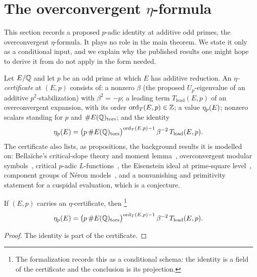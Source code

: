 \section{The overconvergent \texorpdfstring{$\eta$}{eta}-formula}
\label{sec:eta-formula}

This section records a proposed $p$-adic identity at additive odd primes,
the overconvergent $\eta$-formula.  It plays no role in the main theorem.
We state it only as a conditional input, and we explain why the published
results one might hope to derive it from do not apply in the form needed.

\begin{definition}\label{def:closure:eta-published-imports}
Let $E/\mathbb{Q}$ and let $p$ be an odd prime at which $E$ has additive reduction.
An \emph{$\eta$-certificate} at $(E,p)$ consists of: a nonzero $\beta$
(the proposed $U_p$-eigenvalue of an additive $p^2$-stabilization) with
$\beta^2=-p$; a leading term $T_{\mathrm{lead}}(E,p)$ of an overconvergent
expansion, with its order $\mathrm{ord}_T(E,p)\in\mathbb{Z}$; a value
$\eta_p(E)$; nonzero scalars standing for $p$ and $\#E(\mathbb{Q})_{\operatorname{tors}}$; and
the identity
\[
  \eta_p(E)
  =
  \bigl(p\,\#E(\mathbb{Q})_{\operatorname{tors}}\bigr)^{\mathrm{ord}_T(E,p)-1}
  \,\beta^{-2}\,
  T_{\mathrm{lead}}(E,p).
\]
The certificate also lists, as propositions, the background results it
is modelled on: Bella\"iche's critical-slope theory and moment
lemma~\citep{Bellaiche2012}, overconvergent modular
symbols~\citep{PollackStevens2011,ColemanMazur1998}, critical $p$-adic
$L$-functions~\citep{BenoisBuyukboduk2024}, the Eisenstein ideal at
prime-square level~\citep{LangWake2025}, component groups of N\'eron
models~\citep{Lorenzini1993,Ling1997}, and a nonvanishing and primitivity
statement for a cuspidal evaluation, which is a conjecture.
\end{definition}

\begin{theorem}\label{thm:closure:oc-eta-formula}
If $(E,p)$ carries an $\eta$-certificate, then%
\footnote{The formalization records this as a conditional schema: the
identity is a field of the certificate and the conclusion is its
projection.}
\[
  \eta_p(E)
  =
  \bigl(p\,\#E(\mathbb{Q})_{\operatorname{tors}}\bigr)^{\mathrm{ord}_T(E,p)-1}
  \,\beta^{-2}\,
  T_{\mathrm{lead}}(E,p).
\]
\end{theorem}

\begin{proof}
The identity is part of the certificate.
\end{proof}

